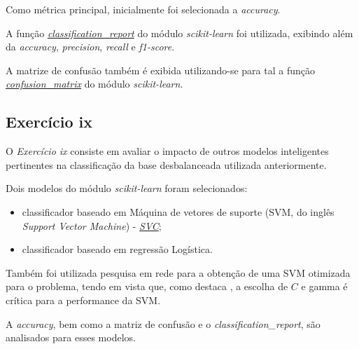 Como métrica principal, inicialmente foi selecionada a \textit{accuracy}.

A função \href{https://scikit-learn.org/stable/modules/generated/sklearn.metrics.classification_report.htmll}{\textit{classification\_report}} do módulo \textit{scikit-learn} foi utilizada, exibindo além da \textit{accuracy}, \textit{precision}, \textit{recall} e \textit{f1-score}.

A matrize de confusão também é exibida utilizando-se para tal a função \href{https://scikit-learn.org/stable/modules/generated/sklearn.metrics.confusion_matrix.html}{\textit{confusion\_matrix}} do módulo \textit{scikit-learn}.

\subsection{Exercício ix}

O \textit{Exercício ix} consiste em avaliar o impacto de outros modelos inteligentes pertinentes na classificação da base desbalanceada utilizada anteriormente.


Dois modelos do módulo \textit{scikit-learn} foram selecionados:
\begin{itemize}
    \item classificador baseado em  Máquina de vetores de suporte (SVM, do inglês \textit{Support Vector Machine}) -  \href{https://scikit-learn.org/stable/modules/generated/sklearn.svm.SVC.html#sklearn-svm-svc}{\textit{SVC}};
    \item classificador baseado em regressão Logística.
\end{itemize}


Também foi utilizada pesquisa em rede para a obtenção de uma SVM otimizada para o problema, tendo em vista que, como destaca \citet{scikit-learn-svn}, a escolha de $C$ e gamma é crítica para a performance da SVM.

A \textit{accuracy}, bem como a  matriz de confusão  e o \textit{classification\_report}, são analisados para esses modelos.

